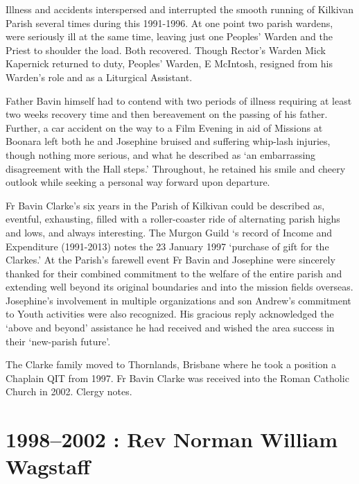 Illness and accidents interspersed and interrupted the smooth running of Kilkivan Parish several times during this 1991-1996. At one point two parish wardens, were seriously ill at the same time, leaving just one Peoples' Warden and the Priest to shoulder the load. Both recovered. Though Rector's Warden Mick Kapernick returned to duty, Peoples' Warden, E McIntosh, resigned from his Warden's role and as a Liturgical Assistant.



Father Bavin himself had to contend with two periods of illness requiring at least two weeks recovery time and then bereavement on the passing of his father. Further, a car accident on the way to a Film Evening in aid of Missions at Boonara left both he and Josephine bruised and suffering whip-lash injuries, though nothing more serious, and what he described as `an embarrassing disagreement with the Hall steps.' Throughout, he retained his smile and cheery outlook while seeking a personal way forward upon departure.



Fr Bavin Clarke's six years in the Parish of Kilkivan could be described as, eventful, exhausting, filled with a roller-coaster ride of alternating parish highs and lows, and always interesting. The Murgon Guild `s record of Income and Expenditure (1991-2013) notes the 23 January 1997 `purchase of gift for the Clarkes.' At the Parish's farewell event Fr Bavin and Josephine were sincerely thanked for their combined commitment to the welfare of the entire parish and extending well beyond its original boundaries and into the mission fields overseas. Josephine's involvement in multiple organizations and son Andrew's commitment to Youth activities were also recognized. His gracious reply acknowledged the `above and beyond' assistance he had received and wished the area success in their `new-parish future'.



The Clarke family moved to Thornlands, Brisbane where he took a position a Chaplain QIT from 1997. Fr Bavin Clarke was received into the Roman Catholic Church in 2002. Clergy notes.



\section{1998--2002 : Rev Norman William Wagstaff}










